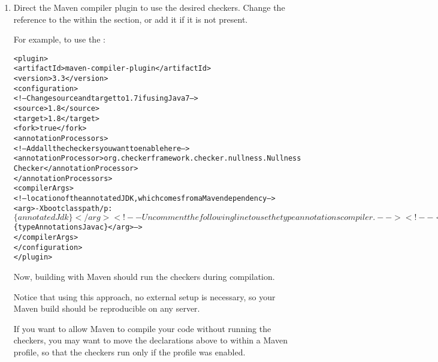 \begin{enumerate}
Change the reference to the  within the 
section, or add it if it is not present.

\begin{alltt}
    <plugin>
        <!-- This plugin will set properties values using dependency information -->
        <groupId>org.apache.maven.plugins</groupId>
        <artifactId>maven-dependency-plugin</artifactId>
        <version>2.3</version>
        <executions>
            <execution>
                <goals>
                    <goal>properties</goal>
                </goals>
            </execution>
        </executions>
    </plugin>
\end{alltt}


\item Direct the Maven compiler plugin to use the desired checkers.
Change the reference to the  within the 
section, or add it if it is not present.

For example, to use the :

\begin{mysmall}
\begin{alltt}
    <plugin>
        <artifactId>maven-compiler-plugin</artifactId>
        <version>3.3</version>
        <configuration>
            <!-- Change source and target to 1.7 if using Java 7 -->
            <source>1.8</source>
            <target>1.8</target>
            <fork>true</fork>
            <annotationProcessors>
                <!-- Add all the checkers you want to enable here -->
                <annotationProcessor>org.checkerframework.checker.nullness.NullnessChecker</annotationProcessor>
            </annotationProcessors>
            <compilerArgs>
                <!-- location of the annotated JDK, which comes from a Maven dependency -->
                <arg>-Xbootclasspath/p:$\{annotatedJdk\}</arg>
                <!-- Uncomment the following line to use the type annotations compiler. -->
                <!-- <arg>-J-Xbootclasspath/p:$\{typeAnnotationsJavac\}</arg> -->
            </compilerArgs>
        </configuration>
    </plugin>
\end{alltt}
\end{mysmall}

Now, building with Maven should run the checkers during compilation.

Notice that using this approach, no external setup is necessary,
so your Maven build should be reproducible on any server.

If you want to allow Maven to compile your code without running the
checkers, you may want to move the declarations above to within a Maven
profile, so that the checkers run only if the profile was enabled.

\end{enumerate}


